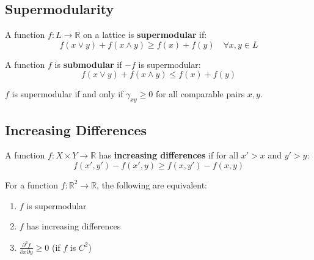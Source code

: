\subsection{Supermodularity}

\begin{definition}
\label{def:supermodular}
A function $f: L \to \mathbb{R}$ on a lattice is \textbf{supermodular} if:
\begin{equation}
f(x \vee y) + f(x \wedge y) \geq f(x) + f(y) \quad \forall x, y \in L
\label{eq:supermodular}
\end{equation}
\end{definition}

\begin{definition}
A function $f$ is \textbf{submodular} if $-f$ is supermodular:
\begin{equation}
f(x \vee y) + f(x \wedge y) \leq f(x) + f(y)
\end{equation}
\end{definition}

\begin{theorem}
\label{thm:supermod-complement}
$f$ is supermodular if and only if $\gamma_{xy} \geq 0$ for all comparable pairs $x, y$.
\end{theorem}

\subsection{Increasing Differences}

\begin{definition}
\label{def:increasing-diff}
A function $f: X \times Y \to \mathbb{R}$ has \textbf{increasing differences} if for all $x' > x$ and $y' > y$:
\begin{equation}
f(x', y') - f(x', y) \geq f(x, y') - f(x, y)
\label{eq:increasing-diff}
\end{equation}
\end{definition}

\begin{theorem}[Equivalence]
\label{thm:equiv-super-id}
For a function $f: \mathbb{R}^2 \to \mathbb{R}$, the following are equivalent:
\begin{enumerate}
    \item $f$ is supermodular
    \item $f$ has increasing differences
    \item $\frac{\partial^2 f}{\partial x \partial y} \geq 0$ (if $f$ is $C^2$)
\end{enumerate}
\end{theorem}

